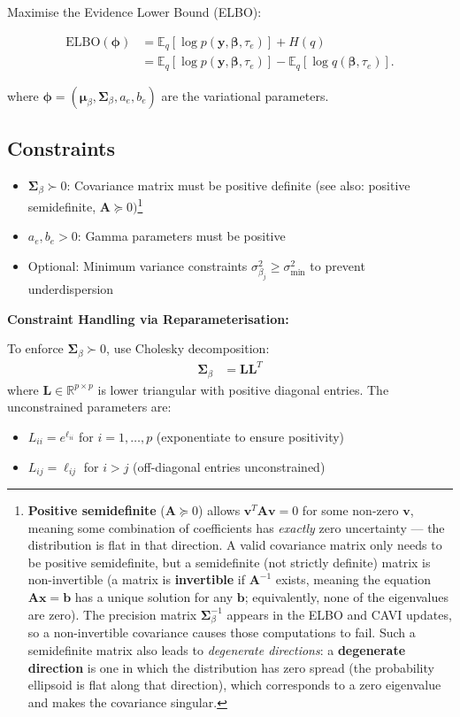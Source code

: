 \documentclass[11pt,a4paper]{article}
\newcommand{\E}{\mathbb{E}}
\newcommand{\R}{\mathbb{R}}
\newcommand{\ELBO}{\text{ELBO}}
\begin{document}
Maximise the Evidence Lower Bound (ELBO):

\begin{align}
\ELBO(\bm{\phi})
&= \E_q[\log p(\bm{y}, \bm{\beta}, \tau_e)] + H(q) \\
&= \E_q[\log p(\bm{y}, \bm{\beta}, \tau_e)] - \E_q[\log q(\bm{\beta}, \tau_e)] .
\end{align}

where $\bm{\phi} = (\bm{\mu}_\beta, \bm{\Sigma}_\beta, a_e, b_e)$ are the variational parameters.

\subsection*{Constraints}

\begin{itemize}
\item $\bm{\Sigma}_\beta \succ 0$: Covariance matrix must be positive definite (see also: positive semidefinite, $\bm{A} \succeq 0)$\footnote{\textbf{Positive semidefinite} ($\bm{A} \succeq 0$) allows $\bm{v}^T\bm{A}\bm{v} = 0$ for some non-zero $\bm{v}$, meaning some combination of coefficients has \emph{exactly} zero uncertainty --- the distribution is flat in that direction. A valid covariance matrix only needs to be positive semidefinite, but a semidefinite (not strictly definite) matrix is non-invertible (a matrix is \textbf{invertible} if $\bm{A}^{-1}$ exists, meaning the equation $\bm{A}\bm{x}=\bm{b}$ has a unique solution for any $\bm{b}$; equivalently, none of the eigenvalues are zero). The precision matrix $\bm{\Sigma}_\beta^{-1}$ appears in the ELBO and CAVI updates, so a non-invertible covariance causes those computations to fail. Such a semidefinite matrix also leads to \emph{degenerate directions}: a \textbf{degenerate direction} is one in which the distribution has zero spread (the probability ellipsoid is flat along that direction), which corresponds to a zero eigenvalue and makes the covariance singular.}
\item $a_e, b_e > 0$: Gamma parameters must be positive
\item Optional: Minimum variance constraints $\sigma^2_{\beta_j} \geq \sigma^2_{\text{min}}$ to prevent underdispersion
\end{itemize}

\textbf{Constraint Handling via Reparameterisation:}

To enforce $\bm{\Sigma}_\beta \succ 0$, use Cholesky decomposition:
\begin{align}
\bm{\Sigma}_\beta &= \bm{L}\bm{L}^T
\end{align}
where $\bm{L} \in \R^{p \times p}$ is lower triangular with positive diagonal entries. The unconstrained parameters are:
\begin{itemize}
\item $L_{ii} = e^{\ell_{ii}}$ for $i=1,\ldots,p$ (exponentiate to ensure positivity)
\item $L_{ij} = \ell_{ij}$ for $i > j$ (off-diagonal entries unconstrained)
\end{itemize}
\end{document}
